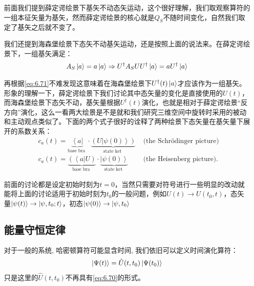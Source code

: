 \documentclass[a4paper,zihao=-4,linespread=1]{ctexrep}
\begin{document}
	前面我们提到薛定谔绘景下基矢不动态矢运动，这个很好理解，我们取观察算符的一组本征矢量为基矢，然而薛定谔绘景的核心就是$Q_S$不随时间变化，自然我们取定了基矢之后就不变了。
	
	我们还提到海森堡绘景下态矢不动基矢运动，还是按照上面的说法来。在薛定谔绘景下，一组基矢满足：
	\[A_S\ket{a}=a\ket{a}\Rightarrow U^\dagger A_SU U^\dagger\ket{a}=aU^\dagger\ket{a}\]
	
	再根据\ref{eq:6.71}不难发现这意味着在海森堡绘景下$U^\dagger(t)\ket{a}$才应该作为一组基矢。形象的理解一下，薛定谔绘景下我们讨论其中态矢量的变化是直接使用的$U(t)$，而海森堡绘景下态矢不动，基矢量根据$U^\dagger (t)$演化，也就是相对于薛定谔绘景“反方向”演化，这么一看两大绘景是不是就和我们研究三维空间中旋转时采用的被动和主动观点类似了。下面的两个式子很好的诠释了两种绘景下态矢量在基矢量下展开的系数关系：
	\begin{align*}
		&c_{a}(t)=\underbrace{\left\langle a\right|}_{\text {base bra }} \cdot \underbrace{\left({U}\left|\psi(0)\right\rangle\right)}_{\text {state ket }} &\text { (the Schrödinger picture) } \\
		&c_{a}(t)=\underbrace{\left(\left\langle a\right| {U}\right)}_{\text {base bra }} \cdot \underbrace{\left|\psi(0)\right\rangle}_{\text {state ket }} & \text { (the Heisenberg picture). }
	\end{align*}
	
	前面的讨论都是设定初始时刻为$t=0$，当然只需要对符号进行一些明显的改动就能将上面的讨论适用于初始时刻为$t_0$的一般问题，例如$U(t)\rightarrow U(t_0,t)$，态矢量$\ket{\psi(t)}\rightarrow\ket{\psi,t_0;t}$，初态$\ket{\psi(0)}\rightarrow\ket{\psi,t_0}$
	
    \subsection{能量守恒定律}
    对于一般的系统, 哈密顿算符可能显含时间, 我们依旧可以定义时间演化算符：
    \begin{equation}
        \label{eq:6.77}
        \ket{\Psi(t)}=\hat{U}(t,t_0)\ket{\Psi(t_0)}
    \end{equation}
    只是这里的$\hat{U}(t,t_0)$不再具有\ref{eq:6.70}的形式。
\end{document}
